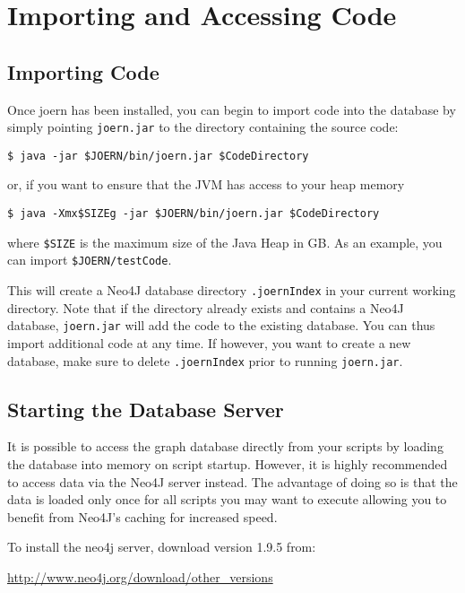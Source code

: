 \documentclass[a4paper]{article}
\newcommand{\code}[1]{\texttt{\small #1}}
\begin{document}
\section{Importing and Accessing Code}
\label{sec:importAccess}

\subsection{Importing Code}

Once joern has been installed, you can begin to import code into the
database by simply pointing \code{joern.jar} to the directory
containing the source code:

\begin{verbatim}
$ java -jar $JOERN/bin/joern.jar $CodeDirectory
\end{verbatim} or, if you want to ensure that the JVM has access to
your heap memory
\begin{verbatim}
$ java -Xmx$SIZEg -jar $JOERN/bin/joern.jar $CodeDirectory
\end{verbatim}

where \code{\$SIZE} is the maximum size of the Java Heap in GB. As an
example, you can import \code{\$JOERN/testCode}.

This will create a Neo4J database directory \code{.joernIndex} in your
current working directory. Note that if the directory already exists
and contains a Neo4J database, \code{joern.jar} will add the code to the
existing database. You can thus import additional code at any time. If
however, you want to create a new database, make sure to delete
\code{.joernIndex} prior to running \code{joern.jar}.


\subsection{Starting the Database Server}

It is possible to access the graph database directly from your scripts
by loading the database into memory on script startup. However, it is
highly recommended to access data via the Neo4J server instead. The
advantage of doing so is that the data is loaded only once for all
scripts you may want to execute allowing you to benefit from Neo4J's
caching for increased speed.

To install the neo4j server, download version 1.9.5 from:

\href{http://www.neo4j.org/download/other\_versions}{http://www.neo4j.org/download/other\_versions}
\end{document}
